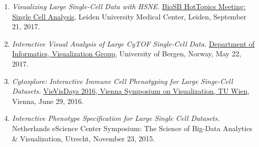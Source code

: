 \documentclass[10pt,a4paper,roman,final]{moderncv}
\begin{document}
\begin{enumerate}[leftmargin=0cm]
\item
\emph{Visualizing Large Single-Cell Data with HSNE.} \href{https://www.biosb.nl/events/biosb-hottopics-meeting-single-cell-analysis/}{BioSB HotTopics Meeting: Single Cell Analysis}, Leiden University Medical Center, Leiden, September 21, 2017.
\item
\emph{Interactive Visual Analysis of Large CyTOF Single-Cell Data.} \href{http://www.ii.uib.no/vis/}{Department of Informatics, Visualization Group}, University of Bergen, Norway, May 22, 2017.
\item
\emph{Cytosplore: Interactive Immune Cell Phenotyping for Large Singe-Cell Datasets.} \href{https://www.cg.tuwien.ac.at/events/vievisdays-2016-vienna-symposium-visualization}{VieVisDays 2016, Vienna Symposium on Visualization, TU Wien}, Vienna, June 29, 2016.
\item
\emph{Interactive Phenotype Specification for Large Single Cell Datasets.} Netherlands eScience Center Symposium: The Science of Big-Data Analytics \& Visualization, Utrecht, November 23, 2015.
\end{enumerate}
\end{document}
